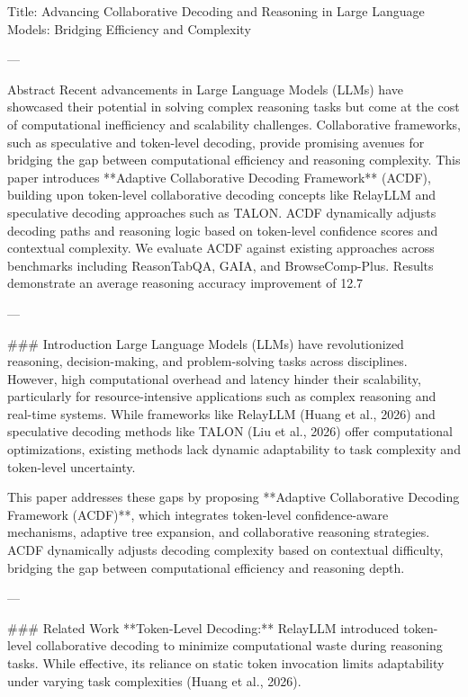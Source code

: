 Title: Advancing Collaborative Decoding and Reasoning in Large Language Models: Bridging Efficiency and Complexity

---

Abstract  
Recent advancements in Large Language Models (LLMs) have showcased their potential in solving complex reasoning tasks but come at the cost of computational inefficiency and scalability challenges. Collaborative frameworks, such as speculative and token-level decoding, provide promising avenues for bridging the gap between computational efficiency and reasoning complexity. This paper introduces **Adaptive Collaborative Decoding Framework** (ACDF), building upon token-level collaborative decoding concepts like RelayLLM and speculative decoding approaches such as TALON. ACDF dynamically adjusts decoding paths and reasoning logic based on token-level confidence scores and contextual complexity. We evaluate ACDF against existing approaches across benchmarks including ReasonTabQA, GAIA, and BrowseComp-Plus. Results demonstrate an average reasoning accuracy improvement of 12.7%

---

### Introduction  
Large Language Models (LLMs) have revolutionized reasoning, decision-making, and problem-solving tasks across disciplines. However, high computational overhead and latency hinder their scalability, particularly for resource-intensive applications such as complex reasoning and real-time systems. While frameworks like RelayLLM (Huang et al., 2026) and speculative decoding methods like TALON (Liu et al., 2026) offer computational optimizations, existing methods lack dynamic adaptability to task complexity and token-level uncertainty.  

This paper addresses these gaps by proposing **Adaptive Collaborative Decoding Framework (ACDF)**, which integrates token-level confidence-aware mechanisms, adaptive tree expansion, and collaborative reasoning strategies. ACDF dynamically adjusts decoding complexity based on contextual difficulty, bridging the gap between computational efficiency and reasoning depth.  

---

### Related Work  
**Token-Level Decoding:** RelayLLM introduced token-level collaborative decoding to minimize computational waste during reasoning tasks. While effective, its reliance on static token invocation limits adaptability under varying task complexities (Huang et al., 2026).  

